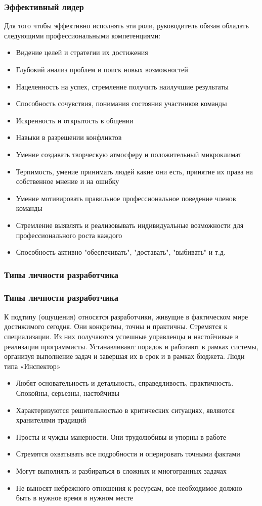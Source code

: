 \documentclass{../industrial-development}
\begin{document}
\begin{frame} \frametitle{Эффективный лидер}
Для того чтобы эффективно исполнять эти роли, руководитель обязан обладать следующими профессиональными компетенциями:
\begin{itemize}
\item Видение целей и стратегии их достижения
\item Глубокий анализ проблем и поиск новых возможностей
\item Нацеленность на успех, стремление получить наилучшие результаты
\item Способность сочувствия, понимания состояния участников команды
\item Искренность и открытость в общении
\item Навыки в разрешении конфликтов
\item Умение создавать творческую атмосферу и положительный микроклимат
\item Терпимость, умение принимать людей какие они есть, принятие их права на собственное мнение и на ошибку
\item Умение мотивировать правильное профессиональное поведение членов команды
\item Стремление выявлять и реализовывать индивидуальные возможности для профессионального роста каждого
\item Способность активно "обеспечивать", "доставать", "выбивать" и т.д.
\end{itemize}
\end{frame}

\begin{frame} \frametitle{Типы личности разработчика}
\end{frame}

\begin{frame} \frametitle{Типы личности разработчика}
К подтипу (ощущения) относятся разработчики, живущие в фактическом мире достижимого сегодня. Они конкретны, точны и практичны. Стремятся к специализации. Из них получаются успешные управленцы и настойчивые в реализации программисты. Устанавливают порядок и работают в рамках системы, организуя выполнение задач и завершая их в срок и в рамках бюджета. Люди типа «Инспектор»
\begin{itemize}
\item Любят основательность и детальность, справедливость, практичность. Спокойны, серьезны, настойчивы
\item Характеризуются решительностью в критических ситуациях, являются хранителями традиций
\item Просты и чужды манерности. Они трудолюбивы и упорны в работе
\item Стремятся охватывать все подробности и оперировать точными фактами
\item Могут выполнять и разбираться в сложных и многогранных задачах
\item Не выносят небрежного отношения к ресурсам, все необходимое должно быть в нужное время в нужном месте
\end{itemize}
\end{frame}
\end{document}
